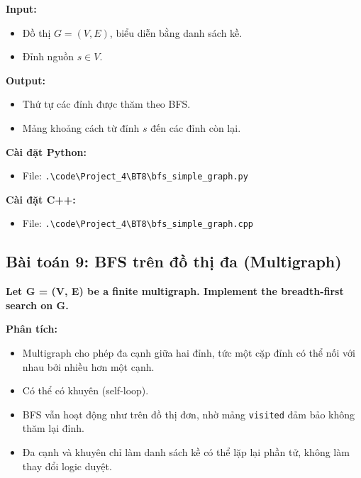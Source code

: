 \documentclass[12pt,a4paper]{article}
\begin{document}
\textbf{Input:}
\begin{itemize}[label=\textbullet]
    \item Đồ thị $ G = (V, E) $, biểu diễn bằng danh sách kề.
    \item Đỉnh nguồn $ s \in V $.
\end{itemize}

\textbf{Output:}
\begin{itemize}[label=\textbullet]
    \item Thứ tự các đỉnh được thăm theo BFS.
    \item Mảng khoảng cách từ đỉnh $ s $ đến các đỉnh còn lại.
\end{itemize}

\textbf{Cài đặt Python:}
\begin{itemize}[label=\textbullet]
   \item File: \texttt{.\textbackslash code\textbackslash Project\_4\textbackslash BT8\textbackslash bfs\_simple\_graph.py}
\end{itemize}

\textbf{Cài đặt C++:}
\begin{itemize}[label=\textbullet]
   \item File: \texttt{.\textbackslash code\textbackslash Project\_4\textbackslash BT8\textbackslash bfs\_simple\_graph.cpp}
\end{itemize}



\subsection{Bài toán 9: BFS trên đồ thị đa (Multigraph)}

\begin{problembox}
    \textbf{Let G = (V, E) be a finite multigraph. Implement the breadth-first search on G.} 
\end{problembox}

\textbf{Phân tích:}
\begin{itemize}[label=\textbullet]
    \item Multigraph cho phép đa cạnh giữa hai đỉnh, tức một cặp đỉnh có thể nối với nhau bởi nhiều hơn một cạnh.
    \item Có thể có khuyên (self-loop).
    \item BFS vẫn hoạt động như trên đồ thị đơn, nhờ mảng \texttt{visited} đảm bảo không thăm lại đỉnh.
    \item Đa cạnh và khuyên chỉ làm danh sách kề có thể lặp lại phần tử, không làm thay đổi logic duyệt.
\end{itemize}
\end{document}
